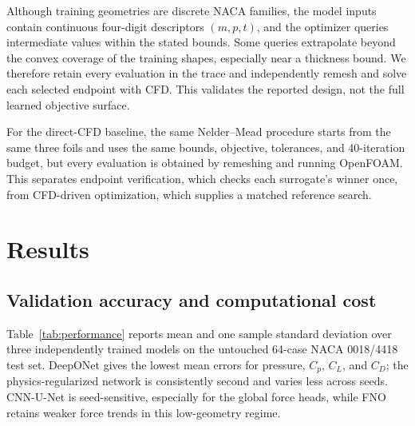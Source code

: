 \documentclass[conference]{IEEEtran}
\begin{document}
Although training geometries are discrete NACA families, the model inputs
contain continuous four-digit descriptors $(m,p,t)$, and the optimizer queries
intermediate values within the stated bounds. Some queries extrapolate beyond
the convex coverage of the training shapes, especially near a thickness bound.
We therefore retain every evaluation in the trace and independently remesh and
solve each selected endpoint with CFD. This validates the reported design, not
the full learned objective surface.

For the direct-CFD baseline, the same Nelder--Mead procedure starts from the
same three foils and uses the same bounds, objective, tolerances, and
40-iteration budget, but every evaluation is obtained by remeshing and running
OpenFOAM. This separates endpoint verification, which checks each surrogate's
winner once, from CFD-driven optimization, which supplies a matched reference
search.

\section{Results}
\subsection{Validation accuracy and computational cost}
Table~\ref{tab:performance} reports mean and one sample standard deviation over
three independently trained models on the untouched 64-case NACA 0018/4418
test set. DeepONet gives the lowest mean errors for pressure, $C_p$, $C_L$, and
$C_D$; the physics-regularized network is consistently second and varies less
across seeds. CNN-U-Net is seed-sensitive, especially for the global force
heads, while FNO retains weaker force trends in this low-geometry regime.

\begin{table}[t]
\caption{Final-test RMSE (mean $\pm$ sample standard deviation over three seeds), size, and speedup.}
\label{tab:performance}
\centering
{}
\end{table}
\end{document}
